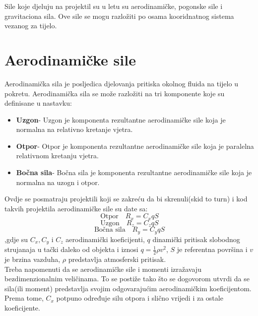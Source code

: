 
Sile koje djeluju na projektil su u letu su aerodinamičke, pogonske sile i 
gravitaciona sila. Ove sile se mogu razložiti po osama kooridnatnog sistema vezanog 
za tijelo. 
\section{Aerodinamičke sile}
Aerodinamička sila je posljedica djelovanja pritiska okolnog fluida na tijelo u pokretu. 
Aerodinamička sila se može razložiti na tri komponente koje su definisane u nastavku:
\begin{itemize}
    \item \textbf{Uzgon}- Uzgon je komponenta rezultantne aerodinamičke sile 
    koja je normalna na relativno kretanje vjetra.
    \item \textbf{Otpor}- Otpor je komponenta rezultantne aerodinamičke sile 
    koja je paralelna relativnom kretanju vjetra.
    \item \textbf{Bočna sila}- Bočna sila je komponenta rezultantne aerodinamičke sile 
    koja je normalna na uzogn i otpor. 
\end{itemize}
Ovdje se posmatraju projektili koji se zakreću da bi skrenuli(skid to turn) i 
kod takvih projektila aerodinamičke sile su date sa:
\begin{equation}
   \text{Otpor} \quad R_x=C_xqS
   \label{eq:aa1}
\end{equation}
\begin{equation}
    \text{Uzgon} \quad R_z=C_zqS
    \label{eq:aa2}
\end{equation}
\begin{equation}
    \text{Bočna sila} \quad R_y=C_yqS
    \label{eq:aa3}
\end{equation}
,gdje su $C_x,C_y$ i $C_z$ aerodinamički koeficijenti, $q$ dinamički pritisak slobodnog strujanaja
u tački daleko od objekta i iznosi $q=\frac{1}{2}\rho v^2$, $S$ je referentna površina i 
$v$ je brzina vazduha, $\rho$ predstavlja atmosferski pritisak.
\\
Treba napomenuti da se aerodinamičke sile i momenti izražavaju bezdimenzionalnim veličinama. 
To se postiže tako što se dogovorom utvrdi da se sila(ili moment) predstavlja svojim odgovarajućim 
aerodinamičkim koeficijentom. Prema tome, $C_x$ potpuno određuje silu otpora i slično vrijedi i 
za ostale koeficijente. \\

